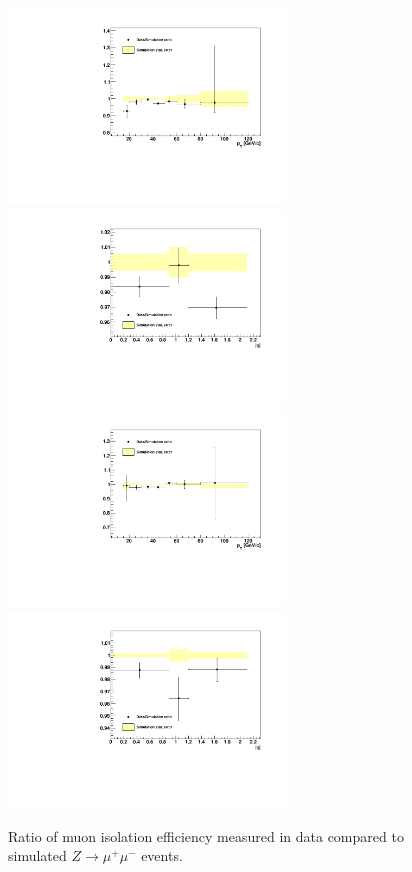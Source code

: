 \begin{figure}[t]
\begin{center}
\includegraphics*[height=52mm]{corrections_chapter/figures/pt_iso_pt_scaled.pdf}
\includegraphics*[height=52mm]{corrections_chapter/figures/etatrig_iso_abseta_scaled.pdf}
\includegraphics*[height=52mm]{corrections_chapter/figures/pt_trigCompX_pt_scaled.pdf}
\includegraphics*[height=52mm]{corrections_chapter/figures/etatrig_trigCompX_abseta_scaled.pdf}
\caption[Muon isolation correction factors]{Ratio of muon isolation efficiency
measured in data compared to simulated $Z\rightarrow\mu^+\mu^-$ events.}
\label{fig:MuonIsoCorrVersusPt}
\end{center}
\end{figure} 


\ifx\master\undefined\fi
